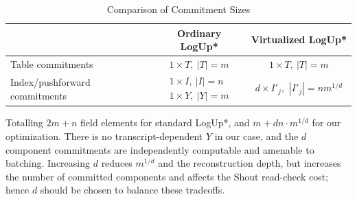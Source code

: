 \begin{table}[!htbp]
    \centering
    \small
    \begin{tabular}{@{}lcc@{}}
    \toprule
    & Ordinary LogUp* & Virtualized LogUp* \\
    \midrule
    Table commitments
    & $1\times T,\ |T|=m$
    & $1\times T,\ |T|=m$ \\
    Index/pushforward commitments
    &
    $\begin{array}{c}
    1\times I,\ |I|=n \\
    1\times Y,\ |Y|=m
    \end{array}$
    &
    $\begin{array}{c}
    d\times I'_j,\,\,
    |I'_j|=nm^{1/d}
    \end{array}$
    \\
    \bottomrule
    \end{tabular}
    \caption{Comparison of Commitment Sizes}
    \label{tab:commit-cost}
\end{table}

Totalling $2m + n$ field elements for standard LogUp*, and $m + dn\cdot m^{1/d}$ for our optimization.
There is no transcript-dependent $Y$ in our case, and the $d$ component commitments are independently 
computable and amenable to batching. Increasing $d$ reduces $m^{1/d}$ and the reconstruction depth, but 
increases the number of committed components and affects the Shout read-check cost; hence $d$ should be 
chosen to balance these tradeoffs.

